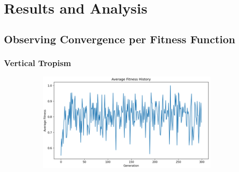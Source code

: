 \section{Results and Analysis}
\subsection{Observing Convergence per Fitness Function}

\subsubsection{Vertical Tropism}

\begin{figure}[H]
    \centering
    \begin{subfigure}[b]{0.3\textwidth}
        \includegraphics[width=\textwidth]{vt_only.png}
    \end{subfigure}
    \begin{subfigure}[b]{0.05\textwidth}

\end{subfigure}
\end{figure}
